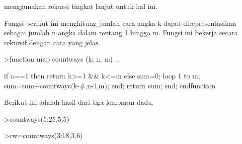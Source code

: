 \documentclass[a4paper,10pt]{article}
\begin{document}
\begin{eulernotebook}
\begin{eulercomment}
\begin{eulercomment}
\begin{eulercomment}
\begin{eulercomment}
\begin{eulercomment}
\begin{eulercomment}
\begin{eulercomment}
\begin{eulercomment}
\begin{eulercomment}
\begin{eulercomment}
\begin{eulercomment}
\begin{eulercomment}
\begin{eulercomment}
\begin{eulercomment}
\begin{eulercomment}
\begin{eulercomment}
\begin{eulercomment}
\begin{eulercomment}
\begin{eulercomment}
\begin{eulercomment}
\begin{eulercomment}
\begin{eulercomment}
\begin{eulercomment}
\begin{eulercomment}
\begin{eulercomment}
\begin{eulercomment}
\begin{eulercomment}
\begin{eulercomment}
\begin{eulercomment}
\begin{eulercomment}
\begin{eulercomment}
\begin{eulercomment}
\begin{eulercomment}
\begin{eulercomment}
\begin{eulercomment}
\begin{eulercomment}
\begin{eulercomment}
\begin{eulercomment}
\begin{eulercomment}
\begin{eulercomment}
\begin{eulercomment}
\begin{eulercomment}
\begin{eulercomment}
\begin{eulercomment}
\begin{eulercomment}
menggunakan rekursi tingkat lanjut untuk hal ini.

Fungsi berikut ini menghitung jumlah cara angka k dapat
direpresentasikan sebagai jumlah n angka dalam rentang 1 hingga m.
Fungsi ini bekerja secara rekursif dengan cara yang jelas.
\end{eulercomment}
\begin{eulerprompt}
>function map countways (k; n, m) ...
\end{eulerprompt}
\begin{eulerudf}
    if n==1 then return k>=1 && k<=m
    else
      sum=0; 
      loop 1 to m; sum=sum+countways(k-#,n-1,m); end;
      return sum;
    end;
  endfunction
\end{eulerudf}
\begin{eulercomment}
Berikut ini adalah hasil dari tiga lemparan dadu.
\end{eulercomment}
\begin{eulerprompt}
>countways(5:25,5,5)
\end{eulerprompt}
\begin{euleroutput}
  [1,  5,  15,  35,  70,  121,  185,  255,  320,  365,  381,  365,  320,
  255,  185,  121,  70,  35,  15,  5,  1]
\end{euleroutput}
\begin{eulerprompt}
>cw=countways(3:18,3,6)
\end{eulerprompt}
\begin{euleroutput}

\end{euleroutput}
\end{eulercomment}
\end{eulercomment}
\end{eulercomment}
\end{eulercomment}
\end{eulercomment}
\end{eulercomment}
\end{eulercomment}
\end{eulercomment}
\end{eulercomment}
\end{eulercomment}
\end{eulercomment}
\end{eulercomment}
\end{eulercomment}
\end{eulercomment}
\end{eulercomment}
\end{eulercomment}
\end{eulercomment}
\end{eulercomment}
\end{eulercomment}
\end{eulercomment}
\end{eulercomment}
\end{eulercomment}
\end{eulercomment}
\end{eulercomment}
\end{eulercomment}
\end{eulercomment}
\end{eulercomment}
\end{eulercomment}
\end{eulercomment}
\end{eulercomment}
\end{eulercomment}
\end{eulercomment}
\end{eulercomment}
\end{eulercomment}
\end{eulercomment}
\end{eulercomment}
\end{eulercomment}
\end{eulercomment}
\end{eulercomment}
\end{eulercomment}
\end{eulercomment}
\end{eulercomment}
\end{eulercomment}
\end{eulercomment}
\end{eulernotebook}
\end{document}
